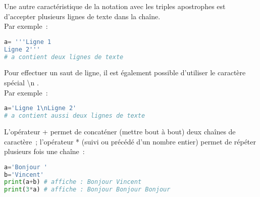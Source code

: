 Une autre caractéristique de la notation avec les triples apostrophes est d'accepter plusieurs lignes de texte dans la chaîne.
\\Par exemple~:
 \begin{lstlisting}[language=Python]
a= '''Ligne 1
Ligne 2''' 
# a contient deux lignes de texte
\end{lstlisting}
Pour effectuer un saut de ligne, il est également possible d'utiliser le caractère spécial \og \textbackslash n \fg{}.
\\Par exemple~:
 \begin{lstlisting}[language=Python]
a='Ligne 1\nLigne 2'
# a contient aussi deux lignes de texte
\end{lstlisting}
L'opérateur + permet de concaténer (mettre bout à bout) deux chaînes de caractère~; l'opérateur * (suivi ou précédé d'un nombre entier) permet de répéter plusieurs fois une chaîne~:
\begin{lstlisting}[language=Python]
a='Bonjour '
b='Vincent'
print(a+b) # affiche : Bonjour Vincent
print(3*a) # affiche : Bonjour Bonjour Bonjour 
\end{lstlisting}

